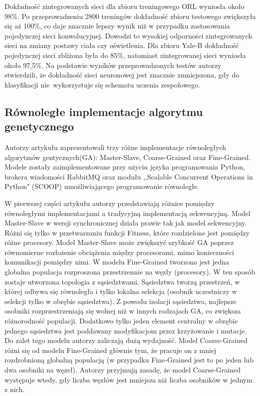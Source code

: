 \documentclass[12pt]{article}
\begin{document}
Dokładność zintegrowanych sieci dla zbioru treningowego ORL wyniosła około 98\%. Po przeprowadzeniu 2800 treningów dokładność zbioru testowego zwiększyła się aż 100\%, co daje
znacznie lepszy wynik niż w przypadku zastosowania pojedynczej sieci konwolucyjnej. Dowodzi to wysokiej odporności zintegrowanych sieci na zmiany postawy ciała czy oświetlenia.
Dla zbioru Yale-B dokładność pojedynczej sieci zbliżona była do 85\%, natomiast zintegrowanej sieci wyniosła około 97,5\%. Na podstawie wyników przeprowadzonych testów
autorzy stwierdzili, że dokładność sieci neuronowej jest znacznie zmniejszona, gdy do klasyfikacji nie~wykorzystuje się schematu uczenia zespołowego.

\subsection{Równoległe implementacje algorytmu genetycznego}

Autorzy artykułu \cite{parallelized-genetic-algorithms} zaprezentowali trzy różne implementacje równoległych algorytmów gentycznych(GA):
Master-Slave, Coarse-Grained oraz Fine-Grained. Modele zostały zaimplementowane przy użyciu języka programowania Python, brokera wiadomości RabbitMQ
oraz modułu ,,Scalable Concurrent Operations in Python" (SCOOP) umożliwiającego programowanie równoległe.

W pierwszej części artykułu autorzy przedstawiają różnice pomiędzy równoległymi implementacjami a tradycyjną implementacją sekwencyjną. Model Master-Slave w wersji synchronicznej
działa prawie tak jak model sekwencyjny. Różni się tylko w przetwarzaniu funkcji Fitness, które rozdzielone jest pomiędzy różne procesory. Model Master-Slave może
zwiększyć szybkość GA poprzez równomierne rozłożenie obciążenia między procesorami, mimo konieczności komunikacji pomiędzy nimi. W modelu Fine-Grained tworzona jest jedna
globalna populacja rozproszona przestrzennie na węzły (procesory). W ten sposób zostaje utworzona topologia z sąsiedztwami. Sąsiedztwa tworzą przestrzeń, w której odbywa się równoległa i
tylko lokalna selekcja (osobnik uczestniczy w selekcji tylko w obrębie sąsiedztwa). Z powodu izolacji sąsiedztwa, najlepsze osobniki rozprzestrzeniają się wolnej niż w innych rodzajach GA,
co zwiększa różnorodność populacji. Dodatkowo tylko jeden element centralny w obrębie jednego sąsiedztwa jest poddawany modyfikacjom przez krzyżowanie i mutacje. Do zalet tego modelu
autorzy zaliczają dużą wydajność. Model Coarse-Grained różni się od modelu Fine-Grained głównie tym, że pracuje on z mniej rozdrobnioną globalną populacją (w przypadku Fine-Grained
jest to po jeden lub dwa osobniki na węzeł). Autorzy przyjmują zasadę, że model Coarse-Grained występuje wtedy, gdy liczba węzłów jest mniejsza niż liczba osobników w jednym z nich.
\end{document}
